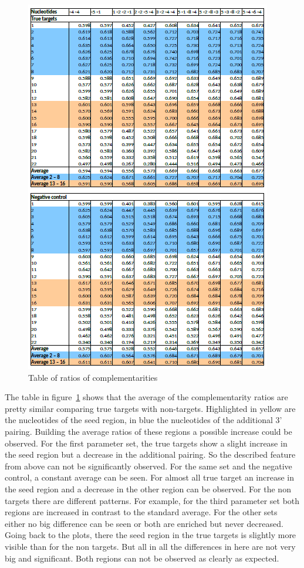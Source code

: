 \documentclass[12pt]{article}
\begin{document}
\begin{figure}
\centering
\includegraphics[scale=1.1]{results/ratio_table2.PNG}
\caption{Table of ratios of complementarities}
\label{table:ratios}
\end{figure}



The table in figure~\ref{table:ratios} shows that the average of the complementarity ratios are pretty similar comparing true targets with non-targets. Highlighted in yellow are the nucleotides of the seed region, in blue the nucleotides of the additional 3' pairing. Building the average ratios of these regions a possible increase could be observed. For the first parameter set, the true targets show a slight increase in the seed region but a decrease in the additional pairing. So the described feature from above can not be significantly observed. For the same set and the negative control, a constant average can be seen. For almost all true target an increase in the seed region and a decrease in the other region can be observed. For the non targets there are different patterns. For example, for the third parameter set both regions are increased in contrast to the standard average. For the other sets either no big difference can be seen or both are enriched but never decreased. Going back to the plots, there the seed region in the true targets is slightly more visible than for the non targets. But all in all the differences in here are not very big and significant. Both regions can not be observed as clearly as expected.  \\
\end{document}
